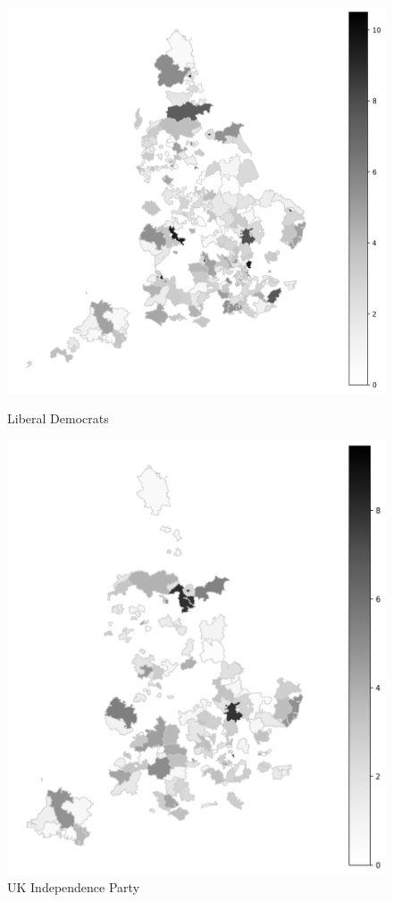 \documentclass[12pt,letterpaper]{article}
\begin{document}
\begin{figure}[H]
	\begin{minipage}[t]{0.335\textwidth}
		\centering
		\includegraphics[width=\textwidth,height=0.68\textheight,keepaspectratio]{plots/LiberalDemocrats_2010GeneralElection_Environmental_Mentions.png}
		\caption{Liberal Democrats}
	\end{minipage}\hfill
	\begin{minipage}[t]{0.335\textwidth}
		\centering
		\includegraphics[width=\textwidth,height=0.68\textheight,keepaspectratio]{plots/UKIndependenceParty_2010GeneralElection_Environmental_Mentions.png}
		\caption{UK Independence Party}
	\end{minipage}
	

\end{figure}
\end{document}
